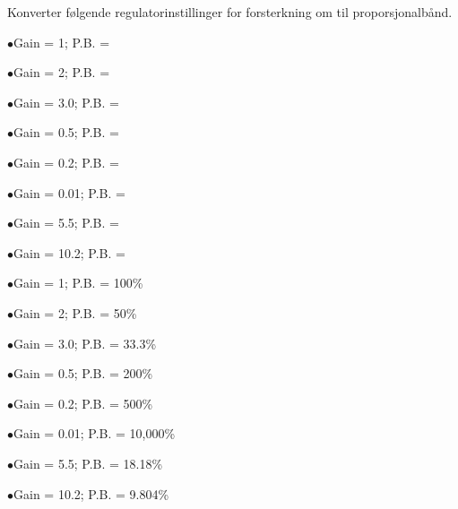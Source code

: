 


Konverter følgende regulatorinstillinger for forsterkning om til proporsjonalbånd. 

\medskip 
\item{$\bullet$}Gain = 1; P.B. = \underbar{\hskip 50pt}
\vskip 5pt
\item{$\bullet$}Gain = 2; P.B. = \underbar{\hskip 50pt} 
\vskip 5pt
\item{$\bullet$}Gain = 3.0; P.B. = \underbar{\hskip 50pt} 
\vskip 5pt
\item{$\bullet$}Gain = 0.5; P.B. = \underbar{\hskip 50pt}
\vskip 5pt
\item{$\bullet$}Gain = 0.2; P.B. = \underbar{\hskip 50pt} 
\vskip 5pt
\item{$\bullet$}Gain = 0.01; P.B. = \underbar{\hskip 50pt} 
\vskip 5pt
\item{$\bullet$}Gain = 5.5; P.B. = \underbar{\hskip 50pt} 
\vskip 5pt
\item{$\bullet$}Gain = 10.2; P.B. = \underbar{\hskip 50pt} 
\medskip 







\medskip 
\item{$\bullet$}Gain = 1; P.B. = 100\%
\vskip 5pt
\item{$\bullet$}Gain = 2; P.B. = 50\%
\vskip 5pt
\item{$\bullet$}Gain = 3.0; P.B. = 33.3\%
\vskip 5pt
\item{$\bullet$}Gain = 0.5; P.B. = 200\%
\vskip 5pt
\item{$\bullet$}Gain = 0.2; P.B. = 500\%
\vskip 5pt
\item{$\bullet$}Gain = 0.01; P.B. = 10,000\%
\vskip 5pt
\item{$\bullet$}Gain = 5.5; P.B. = 18.18\%
\vskip 5pt
\item{$\bullet$}Gain = 10.2; P.B. = 9.804\%
\medskip 












